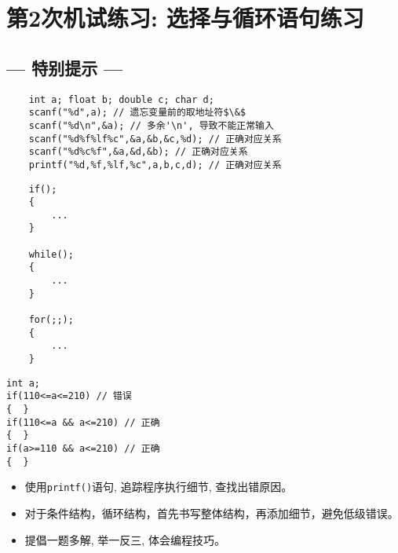 %
%
%
\chapter{第2次机试练习: 选择与循环语句练习}

\section*{--- 特别提示 ---}

\begin{note}
	\begin{lstlisting}
	int a; float b; double c; char d;
	scanf("%d",a); // 遗忘变量前的取地址符$\&$
	scanf("%d\n",&a); // 多余'\n', 导致不能正常输入
	scanf("%d%f%lf%c",&a,&b,&c,%d); // 正确对应关系
	scanf("%d%c%f",&a,&d,&b); // 正确对应关系
	printf("%d,%f,%lf,%c",a,b,c,d); // 正确对应关系
	\end{lstlisting}
\end{note}

\begin{note}
	\begin{lstlisting}
	if();
	{
		...
	}                 
	
	while();
	{
		...
	} 
	
	for(;;);
	{
		...
	}                  
	\end{lstlisting}
\end{note}

\newpage
\begin{note}[用C语言关系表达式准确表达数学含义]
\begin{lstlisting}
int a;
if(110<=a<=210) // 错误
{  }
if(110<=a && a<=210) // 正确 
{  }
if(a>=110 && a<=210) // 正确 
{  }
\end{lstlisting}	
\end{note}

\begin{note}[学习体会编程技巧]
	\begin{itemize}
		\item 使用\lstinline|printf()|语句, 追踪程序执行细节, 查找出错原因。
		\item 对于条件结构，循环结构，首先书写整体结构，再添加细节，避免低级错误。
		\item 提倡一题多解, 举一反三, 体会编程技巧。	
	\end{itemize}
\end{note}


